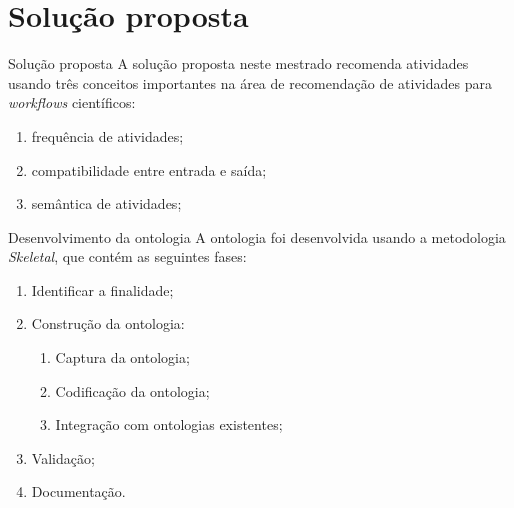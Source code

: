 \section{Solução proposta}

\begin{frame}		
	\begin{block}{Solução proposta}
		A solução proposta neste mestrado recomenda atividades usando três conceitos importantes na área de recomendação de atividades para \emph{workflows} científicos: %
		\begin{enumerate}
			\item frequência de atividades;
			\item compatibilidade entre entrada e saída;
			\item semântica de atividades;
		\end{enumerate}
		
		
	\end{block}
\end{frame}


\begin{frame}		
	\begin{block}{Desenvolvimento da ontologia}
		A ontologia foi desenvolvida usando a metodologia \emph{Skeletal}, que contém as seguintes fases:
		\begin{enumerate}
			\item Identificar a finalidade;
			\item Construção da ontologia:
			\begin{enumerate}
				\item Captura da ontologia;
				\item Codificação da ontologia;
				\item Integração com ontologias existentes;
			\end{enumerate}
			\item Validação;
			\item Documentação.
		\end{enumerate}
	\end{block}
\end{frame}

